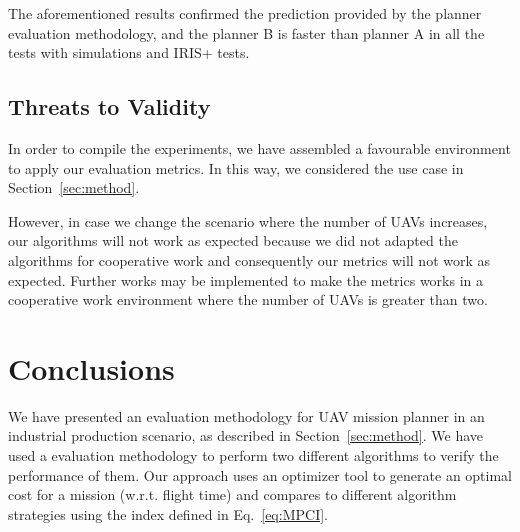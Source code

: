 \documentclass[conference,harvard,brazil,english]{sbatex}
\begin{document}
	
%
%
	
	The aforementioned results confirmed the prediction provided by the planner evaluation methodology, and the planner B is faster than planner A in all the tests with simulations and IRIS+ tests.
	
\subsection{Threats to Validity}
\label{sec:ameacas}

In order to compile the experiments, we have assembled a favourable environment to apply our evaluation metrics. In this way, we considered the use case in Section~\ref{sec:method}.

However, in case we change the scenario where the number of UAVs increases, our algorithms will not work as expected because we did not adapted the algorithms for cooperative work and consequently our metrics will not work as expected. Further works may be implemented to make the metrics works in a cooperative work environment where the number of UAVs is greater than two.


\section{Conclusions}
\label{sec:conclusao}

We have presented an evaluation methodology for UAV mission planner in an industrial production scenario, as described in Section~\ref{sec:method}. We have used a evaluation methodology to perform two different algorithms to verify the performance of them. Our approach uses an optimizer tool to generate an optimal cost for a mission (w.r.t. flight time) and compares to different algorithm strategies using the index defined in Eq.~\ref{eq:MPCI}.
 
\end{document}
